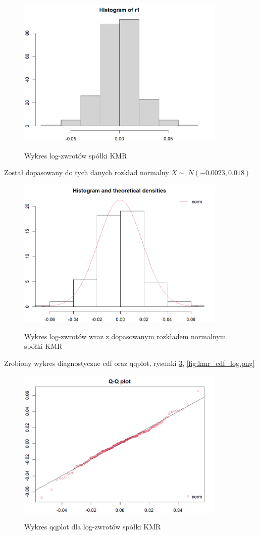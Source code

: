 \documentclass[a4paper,11pt]{article}
\begin{document}
\begin{figure}[htb]
	\centering
	\includegraphics[width=10cm]{kmr_hist_log.png}
        \label{fig:kmr_hist_log}
	\caption{Wykres log-zwrotów spółki KMR}
\end{figure}

Został dopasowany do tych danych rozkład normalny $X \sim\ N(-0.0023, 0.018)$
\begin{figure}[htb]
	\centering
	\includegraphics[width=10cm]{kmr_histW_log.png}
        \label{fig:kmr_histwykres_log}
	\caption{Wykres log-zwrotów wraz z dopasowanym rozkładem normalnym spółki KMR}
\end{figure}

Zrobiony wykres diagnostyczne cdf oraz qqplot, rysunki \ref{fig:kmr_qqplot_log}, \ref{fig:kmr_cdf_log.png}

\begin{figure}[htb]
	\centering
	\includegraphics[width=10cm]{kmr_qqplot_log.png}
        \label{fig:kmr_qqplot_log}
	\caption{Wykres qqplot dla log-zwrotów spółki KMR}
\end{figure}
\end{document}
